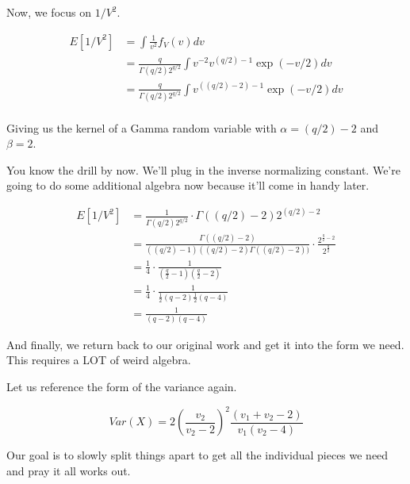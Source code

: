 Now, we focus on $1/V^2$. 

\begin{align*}
	E[1/V^2] &= \int \frac{1}{v^2} f_V(v) dv \\
	&= \frac{q}{\Gamma(q/2) 2^{q/2}} \int v^{-2} v^{(q/2)-1} \exp(-v/2) dv \\
	&= \frac{q}{\Gamma(q/2) 2^{q/2}} \int v^{((q/2) - 2 )-1} \exp(-v/2) dv \\
\end{align*}

Giving us the kernel of a Gamma random variable with $\alpha = (q/2)-2$ and $\beta = 2$.

You know the drill by now. We'll plug in the inverse normalizing constant. We're going to do some additional algebra now because it'll come in handy later.

\begin{align*}
	E[1/V^2] &= \frac{1}{\Gamma(q/2) 2^{q/2}} \cdot \Gamma\left( (q/2) - 2 \right) 2^{(q/2)-2}  \\
	&= \frac{\Gamma((q/2) - 2)}{((q/2) - 1)((q/2) - 2)\Gamma((q/2) - 2))} \cdot \frac{2^{\frac{q}{2} - 2}}{2^{\frac{q}{2}}} \\
	&= \frac{1}{4} \cdot \frac{1}{\left( \frac{q}{2} - 1 \right)\left( \frac{q}{2} - 2 \right)} \\
	&= \frac{1}{4} \cdot \frac{1}{\frac{1}{2}(q-2)\frac{1}{2}(q-4)} \\
	&= \frac{1}{(q-2)(q-4)}
\end{align*}

And finally, we return back to our original work and get it into the form we need. This requires a LOT of weird algebra.

Let us reference the form of the variance again.

\[
	Var(X) = 2\left( \frac{v_2}{v_2 - 2} \right)^2 \frac{(v_1 + v_2 - 2)}{v_1(v_2-4)}
\]

Our goal is to slowly split things apart to get all the individual pieces we need and pray it all works out.

